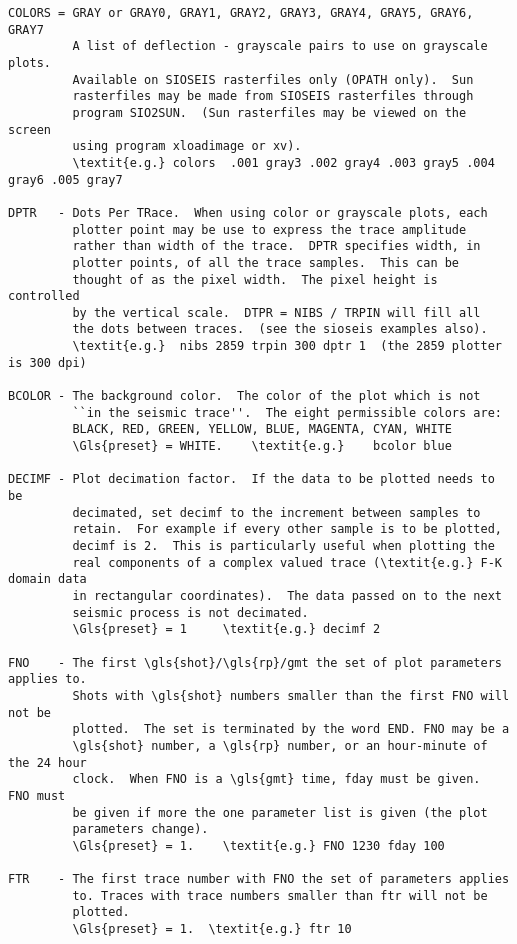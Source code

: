 \begin{verbatim}
COLORS = GRAY or GRAY0, GRAY1, GRAY2, GRAY3, GRAY4, GRAY5, GRAY6, GRAY7
         A list of deflection - grayscale pairs to use on grayscale plots.
         Available on SIOSEIS rasterfiles only (OPATH only).  Sun
         rasterfiles may be made from SIOSEIS rasterfiles through
         program SIO2SUN.  (Sun rasterfiles may be viewed on the screen
         using program xloadimage or xv).
         \textit{e.g.} colors  .001 gray3 .002 gray4 .003 gray5 .004 gray6 .005 gray7

DPTR   - Dots Per TRace.  When using color or grayscale plots, each
         plotter point may be use to express the trace amplitude
         rather than width of the trace.  DPTR specifies width, in
         plotter points, of all the trace samples.  This can be
         thought of as the pixel width.  The pixel height is controlled
         by the vertical scale.  DTPR = NIBS / TRPIN will fill all
         the dots between traces.  (see the sioseis examples also).
         \textit{e.g.}  nibs 2859 trpin 300 dptr 1  (the 2859 plotter is 300 dpi)

BCOLOR - The background color.  The color of the plot which is not
         ``in the seismic trace''.  The eight permissible colors are:
         BLACK, RED, GREEN, YELLOW, BLUE, MAGENTA, CYAN, WHITE
         \Gls{preset} = WHITE.    \textit{e.g.}    bcolor blue

DECIMF - Plot decimation factor.  If the data to be plotted needs to be
         decimated, set decimf to the increment between samples to
         retain.  For example if every other sample is to be plotted,
         decimf is 2.  This is particularly useful when plotting the
         real components of a complex valued trace (\textit{e.g.} F-K domain data
         in rectangular coordinates).  The data passed on to the next
         seismic process is not decimated.
         \Gls{preset} = 1     \textit{e.g.} decimf 2

FNO    - The first \gls{shot}/\gls{rp}/gmt the set of plot parameters applies to.
         Shots with \gls{shot} numbers smaller than the first FNO will not be
         plotted.  The set is terminated by the word END. FNO may be a
         \gls{shot} number, a \gls{rp} number, or an hour-minute of the 24 hour
         clock.  When FNO is a \gls{gmt} time, fday must be given.  FNO must
         be given if more the one parameter list is given (the plot
         parameters change).
         \Gls{preset} = 1.    \textit{e.g.} FNO 1230 fday 100

FTR    - The first trace number with FNO the set of parameters applies
         to. Traces with trace numbers smaller than ftr will not be
         plotted.
         \Gls{preset} = 1.  \textit{e.g.} ftr 10


\end{verbatim}
